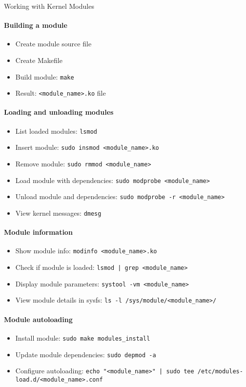 \begin{KR}{Working with Kernel Modules}
    \paragraph{Building a module}
    \begin{itemize}
        \item Create module source file
        \item Create Makefile
        \item Build module: \texttt{make}
        \item Result: \texttt{<module\_name>.ko} file
    \end{itemize}
    
    \paragraph{Loading and unloading modules}
    \begin{itemize}
        \item List loaded modules: \texttt{lsmod}
        \item Insert module: \texttt{sudo insmod <module\_name>.ko}
        \item Remove module: \texttt{sudo rmmod <module\_name>}
        \item Load module with dependencies: \texttt{sudo modprobe <module\_name>}
        \item Unload module and dependencies: \texttt{sudo modprobe -r <module\_name>}
        \item View kernel messages: \texttt{dmesg}
    \end{itemize}
    
    \paragraph{Module information}
    \begin{itemize}
        \item Show module info: \texttt{modinfo <module\_name>.ko}
        \item Check if module is loaded: \texttt{lsmod | grep <module\_name>}
        \item Display module parameters: \texttt{systool -vm <module\_name>}
        \item View module details in sysfs: \texttt{ls -l /sys/module/<module\_name>/}
    \end{itemize}
    
    \paragraph{Module autoloading}
    \begin{itemize}
        \item Install module: \texttt{sudo make modules\_install}
        \item Update module dependencies: \texttt{sudo depmod -a}
        \item Configure autoloading: \texttt{echo "<module\_name>" | sudo tee /etc/modules-load.d/<module\_name>.conf}
    \end{itemize}
\end{KR}

